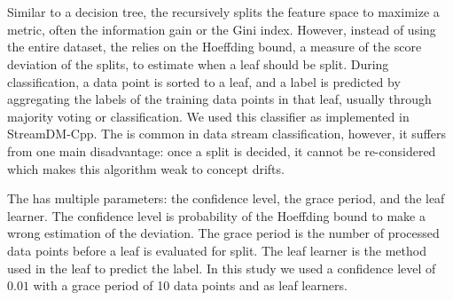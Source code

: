 \subsubsection{\hoeffdingtree~\cite{VFDT}}
Similar to a decision tree, the \hoeffdingtree
recursively splits the feature space to maximize a metric, often the
information gain or the Gini
index. However, instead of using the entire
dataset, the \hoeffdingtree relies on the
Hoeffding bound, a measure of the score deviation
of the splits, to estimate when a leaf should be
split. During classification, a data point
is sorted to a leaf, and a label is predicted by
aggregating the labels of the training data points
in that leaf, usually through majority voting or
\naivebayes classification.  We used this
classifier as implemented in StreamDM-Cpp.  The
\hoeffdingtree is common in data stream
classification, however, it suffers from one main
disadvantage: once a split is decided, it cannot
be re-considered which makes this algorithm weak
to concept drifts.

The \hoeffdingtree has multiple parameters: the
confidence level, the grace period, and the leaf
learner. The confidence level is probability of
the Hoeffding bound to make a wrong estimation of
the deviation. The grace period is the number of
processed data points before a leaf is evaluated for split.
 The leaf learner is the method used in the
leaf to predict the label.  In this study we used
a confidence level of $0.01$ with a grace period
of 10 data points and \naivebayes as leaf
learners.


